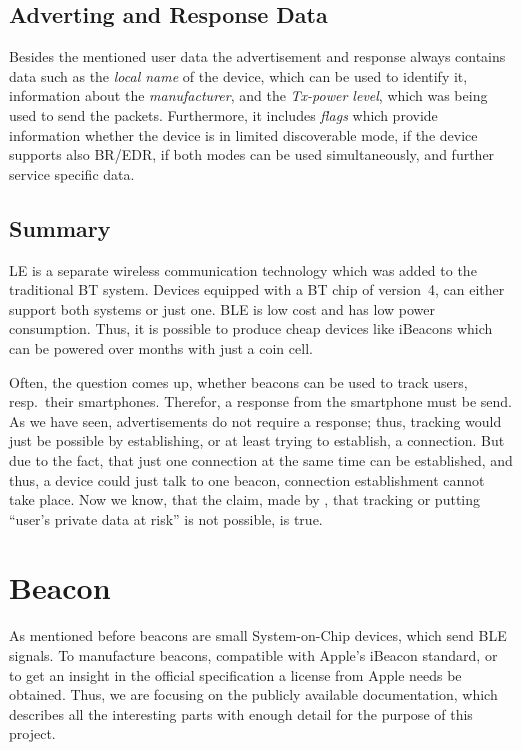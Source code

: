 \subsection*{Adverting and Response Data}
Besides the mentioned user data the advertisement and response always contains data such as the \emph{local name} of the device, which can be used to identify it, information about the \emph{manufacturer}, and the \emph{Tx-power level}, which was being used to send the packets. Furthermore, it includes \emph{flags} which provide information whether the device is in limited discoverable mode, if the device supports also \ac{BR}/\ac{EDR}, if both modes can be used simultaneously, and further service specific data.


\subsection*{Summary}
\acl{LE} is a separate wireless communication technology which was added to the traditional \acl{BT} system. Devices equipped with a \ac{BT} chip of version~4, can either support both systems or just one. \ac{BLE} is low cost and has low power consumption. Thus, it is possible to produce cheap devices like iBeacons which can be powered over months with just a coin cell.

Often, the question comes up, whether beacons can be used to track users, resp.\ their smartphones. Therefor, a response from the smartphone must be send. As we have seen, advertisements do not require a response; thus, tracking would just be possible by establishing, or at least trying to establish, a connection. But due to the fact, that just one connection at the same time can be established, and thus, a device could just talk to one beacon, connection establishment cannot take place. Now we know, that the claim, made by \citet{apple:getting_started}, that tracking or putting ``user's private data at risk'' is not possible, is true.

\section{Beacon}\label{sec:beacon}
As mentioned before beacons are small System-on-Chip devices, which send \acs{BLE} signals. To manufacture beacons, compatible with Apple's iBeacon standard, or to get an insight in the official specification a license from Apple needs be obtained. Thus, we are focusing on the publicly available documentation, which describes all the interesting parts with enough detail for the purpose of this project.

